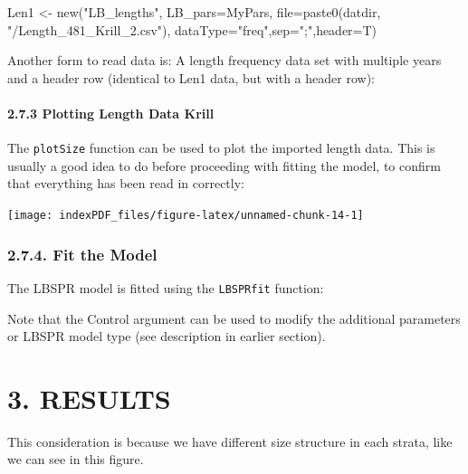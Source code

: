 \documentclass[
]{article}
\newenvironment{Shaded}{\begin{snugshade}}{\end{snugshade}}
\newcommand{\AttributeTok}[1]{\textcolor[rgb]{0.77,0.63,0.00}{#1}}
\newcommand{\FunctionTok}[1]{\textcolor[rgb]{0.00,0.00,0.00}{#1}}
\newcommand{\NormalTok}[1]{#1}
\newcommand{\OtherTok}[1]{\textcolor[rgb]{0.56,0.35,0.01}{#1}}
\newcommand{\StringTok}[1]{\textcolor[rgb]{0.31,0.60,0.02}{#1}}
\begin{document}
\begin{Shaded}
\begin{Highlighting}[]
\NormalTok{Len1 }\OtherTok{\textless{}{-}} \FunctionTok{new}\NormalTok{(}\StringTok{"LB\_lengths"}\NormalTok{, }\AttributeTok{LB\_pars=}\NormalTok{MyPars, }\AttributeTok{file=}\FunctionTok{paste0}\NormalTok{(datdir, }\StringTok{"/Length\_481\_Krill\_2.csv"}\NormalTok{), }\AttributeTok{dataType=}\StringTok{"freq"}\NormalTok{,}\AttributeTok{sep=}\StringTok{";"}\NormalTok{,}\AttributeTok{header=}\NormalTok{T)}
\end{Highlighting}
\end{Shaded}

Another form to read data is: A length frequency data set with multiple
years and a header row (identical to Len1 data, but with a header row):

\hypertarget{plotting-length-data-krill}{%
\paragraph{2.7.3 Plotting Length Data
Krill}\label{plotting-length-data-krill}}

The \texttt{plotSize} function can be used to plot the imported length
data. This is usually a good idea to do before proceeding with fitting
the model, to confirm that everything has been read in correctly:

\begin{center}\texttt{[image: indexPDF\_files/figure-latex/unnamed-chunk-14-1]} \end{center}

\hypertarget{fit-the-model}{%
\subsubsection{2.7.4. Fit the Model}\label{fit-the-model}}

The LBSPR model is fitted using the \texttt{LBSPRfit} function:

Note that the Control argument can be used to modify the additional
parameters or LBSPR model type (see description in earlier section).

\hypertarget{results}{%
\section{3. RESULTS}\label{results}}

This consideration is because we have different size structure in each
strata, like we can see in this figure.
\end{document}
